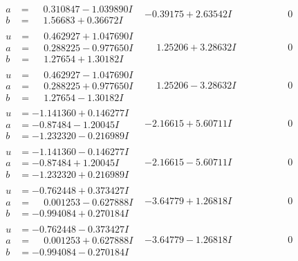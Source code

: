 \documentclass[1p]{elsarticle_modified}
\theoremstyle{definition}
\begin{document}
$$\begin{array}{c|c|c}
\begin{aligned}
a &= \phantom{-}0.310847 - 1.039890 I \\
b &= \phantom{-}1.56683 + 0.36672 I\end{aligned}
 & -0.39175 + 2.63542 I & \phantom{-0.000000 } 0 \\ \hline\begin{aligned}
u &= \phantom{-}0.462927 + 1.047690 I \\
a &= \phantom{-}0.288225 - 0.977650 I \\
b &= \phantom{-}1.27654 + 1.30182 I\end{aligned}
 & \phantom{-}1.25206 + 3.28632 I & \phantom{-0.000000 } 0 \\ \hline\begin{aligned}
u &= \phantom{-}0.462927 - 1.047690 I \\
a &= \phantom{-}0.288225 + 0.977650 I \\
b &= \phantom{-}1.27654 - 1.30182 I\end{aligned}
 & \phantom{-}1.25206 - 3.28632 I & \phantom{-0.000000 } 0 \\ \hline\begin{aligned}
u &= -1.141360 + 0.146277 I \\
a &= -0.87484 - 1.20045 I \\
b &= -1.232320 - 0.216989 I\end{aligned}
 & -2.16615 + 5.60711 I & \phantom{-0.000000 } 0 \\ \hline\begin{aligned}
u &= -1.141360 - 0.146277 I \\
a &= -0.87484 + 1.20045 I \\
b &= -1.232320 + 0.216989 I\end{aligned}
 & -2.16615 - 5.60711 I & \phantom{-0.000000 } 0 \\ \hline\begin{aligned}
u &= -0.762448 + 0.373427 I \\
a &= \phantom{-}0.001253 - 0.627888 I \\
b &= -0.994084 + 0.270184 I\end{aligned}
 & -3.64779 + 1.26818 I & \phantom{-0.000000 } 0 \\ \hline\begin{aligned}
u &= -0.762448 - 0.373427 I \\
a &= \phantom{-}0.001253 + 0.627888 I \\
b &= -0.994084 - 0.270184 I\end{aligned}
 & -3.64779 - 1.26818 I & \phantom{-0.000000 } 0\\

\end{array}$$
\end{document}
